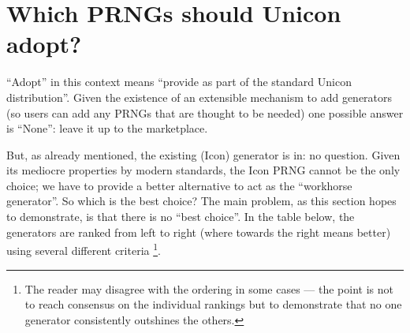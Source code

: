 \documentclass[letterpaper,12pt]{article}
\begin{document}
\section{Which PRNGs should Unicon adopt?}

``Adopt'' in this context means ``provide as part of the standard Unicon
distribution''. Given the existence of an extensible mechanism to add
generators (so users can add any PRNGs that are thought to be needed) one
possible answer is ``None'': leave it up to the marketplace.

But, as already mentioned, the existing (Icon) generator is in: no
question.  Given its mediocre properties by modern standards, the Icon PRNG
cannot be the only choice; we have to provide a better alternative to act
as the ``workhorse generator''.  So which is the best choice? The main
problem, as this section hopes to demonstrate, is that there is no ``best
choice''. In the table below, the generators are ranked from left to right
(where towards the right means better) using several different criteria%
\footnote{
  The reader may disagree with the ordering in some cases --- the point is
  not to reach consensus on the individual rankings but to demonstrate that
  no one generator consistently outshines the others.
}.
\end{document}
